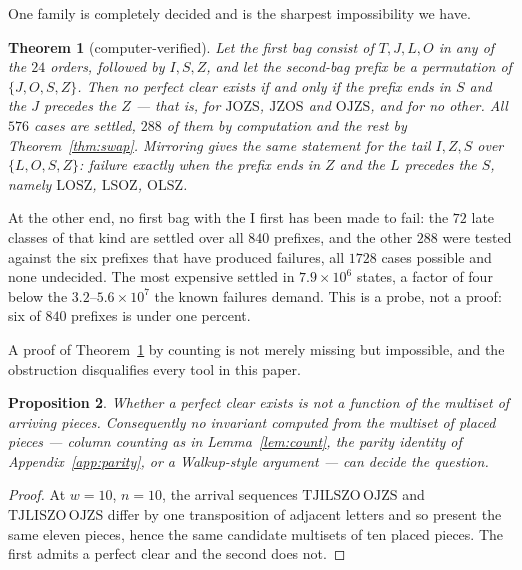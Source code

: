 \documentclass[11pt,a4paper]{article}
\theoremstyle{plain}
\newtheorem{theorem}{Theorem}
\newtheorem{proposition}[theorem]{Proposition}
\theoremstyle{definition}
\theoremstyle{remark}
\begin{document}
One family is completely decided and is the sharpest impossibility we have.

\begin{theorem}[computer-verified]
\label{thm:family}
Let the first bag consist of $T, J, L, O$ in any of the $24$ orders, followed by
$I, S, Z$, and let the second-bag prefix be a permutation of $\{J, O, S, Z\}$. Then no
perfect clear exists \emph{if and only if} the prefix ends in $S$ and the $J$ precedes
the $Z$ --- that is, for $\mathrm{JOZS}$, $\mathrm{JZOS}$ and $\mathrm{OJZS}$, and for
no other. All $576$ cases are settled, $288$ of them by computation and the rest by
Theorem~\ref{thm:swap}. Mirroring gives the same statement for the tail $I, Z, S$ over
$\{L, O, S, Z\}$: failure exactly when the prefix ends in $Z$ and the $L$ precedes the
$S$, namely $\mathrm{LOSZ}$, $\mathrm{LSOZ}$, $\mathrm{OLSZ}$.
\end{theorem}

At the other end, no first bag with the I first has been made to fail: the $72$ late
classes of that kind are settled over all $840$ prefixes, and the other $288$ were
tested against the six prefixes that have produced failures, all $1728$ cases possible
and none undecided. The most expensive settled in $7.9 \times 10^6$ states, a factor of
four below the $3.2$--$5.6 \times 10^7$ the known failures demand. This is a
probe, not a proof: six of $840$ prefixes is under one percent.

A proof of Theorem~\ref{thm:family} by counting is not merely missing but impossible,
and the obstruction disqualifies every tool in this paper.

\begin{proposition}
\label{prop:nostatic}
Whether a perfect clear exists is not a function of the multiset of arriving pieces.
Consequently no invariant computed from the multiset of placed pieces --- column
counting as in Lemma~\ref{lem:count}, the parity identity of
Appendix~\ref{app:parity}, or a Walkup-style argument --- can decide the question.
\end{proposition}

\begin{proof}
At $w = 10$, $n = 10$, the arrival sequences $\mathrm{TJILSZO}\,\mathrm{OJZS}$ and
$\mathrm{TJLISZO}\,\mathrm{OJZS}$ differ by one transposition of adjacent letters and
so present the same eleven pieces, hence the same candidate multisets of ten placed
pieces. The first admits a perfect clear and the second does not.
\end{proof}
\end{document}
